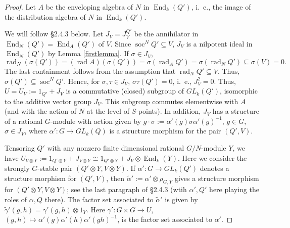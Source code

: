 \documentclass[11pt,leqno,amscd,amssymb,verbatim, url]{amsart}
\theoremstyle{definition}
\numberwithin{equation}{thm}
\newcommand{\End}{\operatorname{End}}
\newcommand{\soc}{\operatorname{soc}}
\newcommand{\rad}{\operatorname{rad}}
\begin{document}
\begin{proof} Let $A$ be the enveloping algebra of $N$ in $\End_k(Q')$, i.~e., the image of the distribution
algebra of $N$ in $\End_k(Q')$. 

We will follow \S2.4.3 below. Let $J_V=J_V^{Q'}$ be the annihilator in $\End_{N}(Q')=\End_A(Q')$ of $V$.  Since $\soc^NQ'\subseteq V$, $J_V$ is
a nilpotent ideal in $\End_{N}(Q')$ by Lemma \ref{firstlemma}. If $\sigma\in J_V$, 
$$\rad_N(\sigma(Q'))=(\rad A)(\sigma (Q')) =\sigma(\rad_A Q')=\sigma(\rad_N Q')\subseteq\sigma(V)=0.$$
The last containment follows from the assumption that $\rad_NQ'\subseteq V$. Thus,
 $\sigma(Q')\subseteq\soc^NQ'$. Hence, for $\sigma,\tau\in J_V$, $\sigma\tau(Q')=0$, i.~e., $J_V^2=0$.  Thus, $U=U_V:=1_{Q'}+J_V$ is a commutative (closed) subgroup of
$GL_k(Q')$, isomorphic to the additive
vector group $J_V$. This subgroup commutes elementwise with $A$ (and with the action of $N$
at the level of $S$-points). In addition, $J_V$ has a structure of a rational $G$-module with action
given by $g\cdot \sigma:=\alpha'(g)\sigma\alpha'(g)^{-1}$, $g\in G$, $\sigma\in J_V$, where $\alpha':G\to
GL_k(Q)$ is a structure morphism for the pair $(Q',V)$. 

Tensoring $Q'$ with any nonzero finite dimensional rational $G/N$-module $Y$, we have $U_{V\otimes Y}:= 1_{Q'\otimes Y} + J_{V\otimes Y}
\cong 1_{Q'\otimes Y}+ J_V\otimes \End_k(Y)$. Here we consider the strongly $G$-stable pair $(Q'\otimes Y, V\otimes Y)$.
If $\alpha':G\to GL_k(Q')$ denotes a structure morphism for $(Q',V)$, 
then $\widetilde\alpha':=\alpha'\otimes \rho_{G,Y}$ gives a structure morphism for $(Q'\otimes Y,V\otimes Y)$; see the last paragraph of \S2.4.3 (wtih $\alpha',Q'$ here playing the roles of $\alpha,Q$ there). The factor set associated
to $\widetilde\alpha'$ is given by $\widetilde\gamma'(g,h)=\gamma'(g,h)\otimes 1_Y$. Here
$\gamma':G\times G\to U$, $(g,h)\mapsto\alpha'(g)\alpha'(h)\alpha'(gh)^{-1}$,  is the factor set associated to $\alpha'$.


\end{proof}
\end{document}
